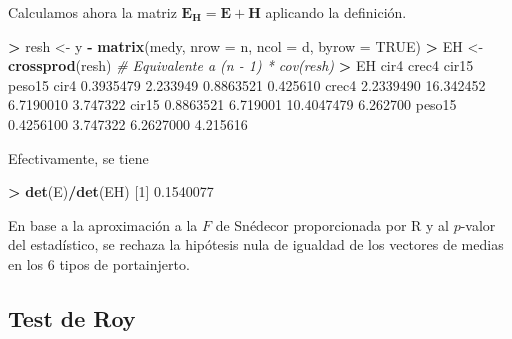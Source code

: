 \documentclass[
  a4paper,
  oneside]{scrbook}
\newenvironment{Shaded}{\begin{snugshade}}{\end{snugshade}}
\newcommand{\AttributeTok}[1]{\textcolor[rgb]{0.13,0.29,0.53}{#1}}
\newcommand{\CommentTok}[1]{\textcolor[rgb]{0.56,0.35,0.01}{\textit{#1}}}
\newcommand{\ConstantTok}[1]{\textcolor[rgb]{0.56,0.35,0.01}{#1}}
\newcommand{\DecValTok}[1]{\textcolor[rgb]{0.00,0.00,0.81}{#1}}
\newcommand{\FloatTok}[1]{\textcolor[rgb]{0.00,0.00,0.81}{#1}}
\newcommand{\FunctionTok}[1]{\textcolor[rgb]{0.13,0.29,0.53}{\textbf{#1}}}
\newcommand{\NormalTok}[1]{#1}
\newcommand{\OtherTok}[1]{\textcolor[rgb]{0.56,0.35,0.01}{#1}}
\newcommand{\SpecialCharTok}[1]{\textcolor[rgb]{0.81,0.36,0.00}{\textbf{#1}}}
\theoremstyle{definition}
\theoremstyle{definition}
\theoremstyle{definition}
\theoremstyle{definition}
\theoremstyle{remark}
\begin{document}
\normalsize

Calculamos ahora la matriz \(\bm{E_H}=\bm{E}+\bm{H}\) aplicando la
definición.

\footnotesize

\begin{Shaded}
\begin{Highlighting}[]
\SpecialCharTok{\textgreater{}}\NormalTok{ resh }\OtherTok{\textless{}{-}}\NormalTok{ y }\SpecialCharTok{{-}} \FunctionTok{matrix}\NormalTok{(medy, }\AttributeTok{nrow =}\NormalTok{ n, }\AttributeTok{ncol =}\NormalTok{ d, }\AttributeTok{byrow =} \ConstantTok{TRUE}\NormalTok{)}
\SpecialCharTok{\textgreater{}}\NormalTok{ EH }\OtherTok{\textless{}{-}} \FunctionTok{crossprod}\NormalTok{(resh)  }\CommentTok{\# Equivalente a (n {-} 1) * cov(resh)}
\SpecialCharTok{\textgreater{}}\NormalTok{ EH}
\NormalTok{            cir4     crec4      cir15   peso15}
\NormalTok{cir4   }\FloatTok{0.3935479}  \FloatTok{2.233949}  \FloatTok{0.8863521} \FloatTok{0.425610}
\NormalTok{crec4  }\FloatTok{2.2339490} \FloatTok{16.342452}  \FloatTok{6.7190010} \FloatTok{3.747322}
\NormalTok{cir15  }\FloatTok{0.8863521}  \FloatTok{6.719001} \FloatTok{10.4047479} \FloatTok{6.262700}
\NormalTok{peso15 }\FloatTok{0.4256100}  \FloatTok{3.747322}  \FloatTok{6.2627000} \FloatTok{4.215616}
\end{Highlighting}
\end{Shaded}

\normalsize

Efectivamente, se tiene

\footnotesize

\begin{Shaded}
\begin{Highlighting}[]
\SpecialCharTok{\textgreater{}} \FunctionTok{det}\NormalTok{(E)}\SpecialCharTok{/}\FunctionTok{det}\NormalTok{(EH)}
\NormalTok{[}\DecValTok{1}\NormalTok{] }\FloatTok{0.1540077}
\end{Highlighting}
\end{Shaded}

\normalsize

En base a la aproximación a la \(F\) de Snédecor proporcionada por R y al
\(p\)-valor del estadístico, se rechaza la hipótesis nula de igualdad de
los vectores de medias en los 6 tipos de portainjerto.

\subsection{Test de Roy}\label{test-de-roy}
\end{document}
